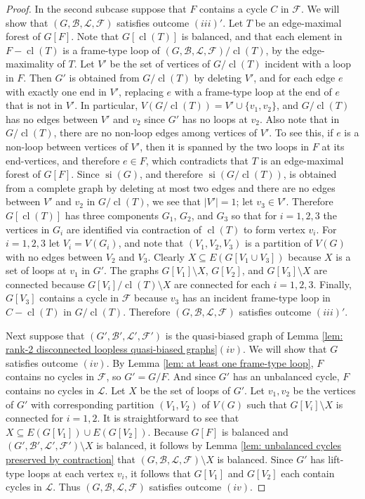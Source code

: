 \documentclass[12pt]{article}
\theoremstyle{definition}
\theoremstyle{plain} %
\newcommand{\cB}{\mathcal{B}}
\newcommand{\cF}{\mathcal{F}}
\newcommand{\cL}{\mathcal{L}}
\DeclareMathOperator{\si}{si}
\DeclareMathOperator{\cl}{cl}
\newcommand{\del}{\!\setminus\!}
\newcommand{\qbg}{\ensuremath{(G,\cB,\cL,\cF)}}
\newcommand{\qbgp}{\ensuremath{(G',\cB',\cL',\cF')}}
\begin{document}
\begin{proof}
In the second subcase suppose that $F$ contains a cycle $C$ in $\cF$.
We will show that $(G, \cB, \cL, \cF)$ satisfies outcome $(iii)'$.
Let $T$ be an edge-maximal forest of $G[F]$.
Note that $G[\cl(T)]$ is balanced, and that each element in $F - \cl(T)$ is a frame-type loop of $(G, \cB, \cL, \cF)/\cl(T)$, by the edge-maximality of $T$.
Let $V'$ be the set of vertices of $G/\cl(T)$ incident with a loop in $F$.
Then $G'$ is obtained from $G/\cl(T)$ by deleting $V'$, and for each edge $e$ with exactly one end in $V'$, replacing $e$ with a frame-type loop at the end of $e$ that is not in $V'$.
In particular, $V(G/\cl(T)) = V' \cup \{v_1, v_2\}$, and $G/\cl(T)$ has no edges between $V'$ and $v_2$ since $G'$ has no loops at $v_2$.
Also note that in $G/\cl(T)$, there are no non-loop edges among vertices of $V'$.
To see this, if $e$ is a non-loop between vertices of $V'$, then it is spanned by the two loops in $F$ at its end-vertices, and therefore $e \in F$, which contradicts that $T$ is an edge-maximal forest of $G[F]$.
Since $\si(G)$, and therefore $\si(G/\cl(T))$, is obtained from a complete graph by deleting at most two edges and there are no edges between $V'$ and $v_2$ in $G/\cl(T)$, we see that $|V'| = 1$; let $v_3 \in V'$.
Therefore $G[\cl(T)]$ has three components $G_1$, $G_2$, and $G_3$ so that for $i = 1,2,3$ the vertices in $G_i$ are identified via contraction of $\cl(T)$ to form vertex $v_i$.
For $i = 1,2,3$ let $V_i = V(G_i)$, and note that $(V_1, V_2, V_3)$ is a partition of $V(G)$ with no edges between $V_2$ and $V_3$.
Clearly $X \subseteq E(G[V_1 \cup V_3])$ because $X$ is a set of loops at $v_1$ in $G'$.
The graphs $G[V_1] \del X$, $G[V_2]$, and $G[V_3] \del X$ are connected because $G[V_i]/\cl(T)\del X$ are connected for each $i=1,2,3$.
Finally, $G[V_3]$ contains a cycle in $\cF$ because $v_3$ has an incident frame-type loop in $C-\cl(T)$ in $G/\cl(T)$.
Therefore $(G, \cB, \cL, \cF)$ satisfies outcome $(iii)'$.

Next suppose that $\qbgp$ is the quasi-biased graph of Lemma \ref{lem: rank-2 disconnected loopless quasi-biased graphs}$(iv)$. We will show that $G$ satisfies outcome $(iv)$. By Lemma \ref{lem: at least one frame-type loop}, $F$ contains no cycles in $\cF$, so $G'=G/F$. And since $G'$ has an unbalanced cycle, $F$ contains no cycles in $\cL$. Let $X$ be the set of loops of $G'$. Let $v_1,v_2$ be the vertices of $G'$ with corresponding partition $(V_1,V_2)$ of $V(G)$ such that $G[V_i]\del X$ is connected for $i=1,2$. It is straightforward to see that $X\subseteq E(G[V_1])\cup E(G[V_2])$. Because $G[F]$ is balanced and $\qbgp\del X$ is balanced, it follows by Lemma \ref{lem: unbalanced cycles preserved by contraction} that $\qbg\del X$ is balanced. Since $G'$ has lift-type loops at each vertex $v_i$, it follows that $G[V_1]$ and $G[V_2]$ each contain cycles in $\cL$. Thus $\qbg$ satisfies outcome $(iv)$.


\end{proof}
\end{document}

